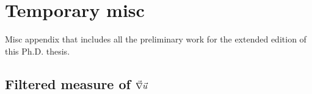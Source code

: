 \chapter{Temporary misc}\label{app:misc}

Misc appendix that includes all the preliminary work for the extended edition of this Ph.D. thesis.

\section{Filtered measure of $\vec{\nabla} \vec{u}$}

% 
